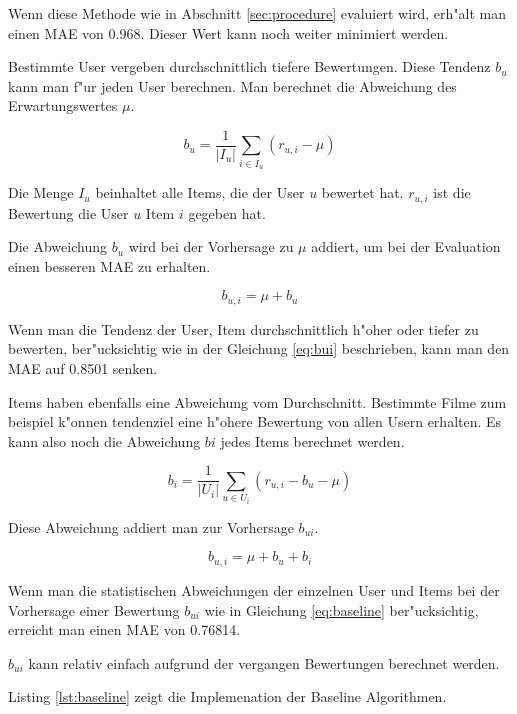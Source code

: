 \documentclass[a4paper, 12pt]{article}
\begin{document}
Wenn diese Methode wie in Abschnitt \ref{sec:procedure} evaluiert wird, erh"alt man einen MAE von 0.968. Dieser Wert kann noch weiter minimiert werden.

Bestimmte User vergeben durchschnittlich tiefere Bewertungen. Diese Tendenz $b_u$ kann man f"ur jeden User berechnen. Man berechnet die Abweichung des Erwartungswertes $\mu$.

\begin{equation}
  b_u = \frac{1}{|I_u|}\sum_{i \in I_u}(r_{u,i} - \mu)
\end{equation}

Die Menge $I_u$ beinhaltet alle Items, die der User $u$ bewertet hat. $r_{u,i}$ ist die Bewertung die User $u$ Item $i$ gegeben hat.

Die Abweichung $b_u$ wird bei der Vorhersage zu $\mu$ addiert, um bei der Evaluation einen besseren MAE zu erhalten.

\begin{equation}
  \label{eq:bui}
  b_{u,i} = \mu + b_u
\end{equation}

Wenn man die Tendenz der User, Item durchschnittlich h"oher oder tiefer zu bewerten, ber"ucksichtig wie in der Gleichung \ref{eq:bui} beschrieben, kann man den MAE auf 0.8501 senken. 

Items haben ebenfalls eine Abweichung vom Durchschnitt. Bestimmte Filme zum beispiel k"onnen tendenziel eine h"ohere Bewertung von allen Usern erhalten. Es kann also noch die Abweichung $bi$ jedes Items berechnet werden.

\begin{equation}
  \label{eq:bi}
  b_i = \frac{1}{|U_i|}\sum_{u \in U_i}(r_{u,i} - b_u - \mu)
\end{equation}

Diese Abweichung addiert man zur Vorhersage $b_{ui}$.

\begin{equation}
  \label{eq:baseline}
  b_{u,i} = \mu + b_u + b_i
\end{equation}

Wenn man die statistischen Abweichungen der einzelnen User und Items bei der Vorhersage einer Bewertung $b_{ui}$ wie in Gleichung \ref{eq:baseline} ber"ucksichtig, erreicht man einen MAE von 0.76814.

$b_{ui}$ kann relativ einfach aufgrund der vergangen Bewertungen berechnet werden.

Listing \ref{lst:baseline} zeigt die Implemenation der Baseline Algorithmen.
\end{document}
